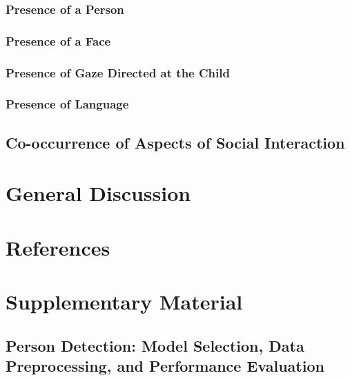 \documentclass[
  man,floatsintext]{apa6}
\begin{document}
\subsubsection{Presence of a Person}\label{presence-of-a-person}

\subsubsection{Presence of a Face}\label{presence-of-a-face}

\subsubsection{Presence of Gaze Directed at the Child}\label{presence-of-gaze-directed-at-the-child}

\subsubsection{Presence of Language}\label{presence-of-language}

\subsection{Co-occurrence of Aspects of Social Interaction}\label{co-occurrence-of-aspects-of-social-interaction}

\section{General Discussion}\label{general-discussion}

\newpage

\section{References}\label{references}

\newpage

\section{Supplementary Material}\label{supplementary-material}

\subsection{Person Detection: Model Selection, Data Preprocessing, and Performance Evaluation}\label{person-detection-model-selection-data-preprocessing-and-performance-evaluation}
\end{document}
